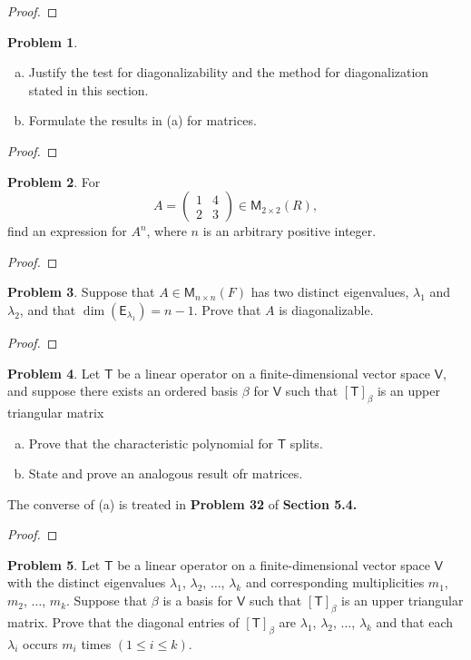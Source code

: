\documentclass[12pt]{book}
\theoremstyle{definition}
\newtheorem{problem}{Problem}
\begin{document}
	\begin{proof}
	\end{proof}
	\newpage
	\begin{problem}$\mathit{ }$
		\begin{enumerate}[(a)]
			\item Justify the test for diagonalizability and the method for diagonalization stated in this section.
			\item Formulate the results in (a) for matrices.
		\end{enumerate}
	\end{problem}
	\begin{proof}
	\end{proof}
	\newpage
	\begin{problem}
		For $$A=\begin{pmatrix}
			1&4\\2&3
		\end{pmatrix}\in\mathsf{M}_{2\times 2}(R),$$
		find an expression for $A^n$, where $n$ is an arbitrary positive integer.
	\end{problem}
	\begin{proof}
	\end{proof}
	\newpage
	\begin{problem}
		Suppose that $A\in\mathsf{M}_{n\times n}(F)$ has two distinct eigenvalues, $\lambda_1$ and $\lambda_2$, and that $\dim(\mathsf{E}_{\lambda_1})=n-1.$ Prove that $A$ is diagonalizable.
	\end{problem}
	\begin{proof}
	\end{proof}
	\newpage
	\begin{problem}
		Let $\mathsf{T}$ be a linear operator on a finite-dimensional vector space $\mathsf{V}$, and suppose there exists an ordered basis $\beta$ for $\mathsf{V}$ such that $[\mathsf{T}]_\beta$ is an upper triangular matrix
		\begin{enumerate}[(a)]
			\item Prove that the characteristic polynomial for $\mathsf{T}$ splits.
			\item State and prove an analogous result ofr matrices.
		\end{enumerate}
		The converse of (a) is treated in \textbf{Problem 32} of \textbf{Section 5.4.}
	\end{problem}
	\begin{proof}
	\end{proof}
	\newpage
	\begin{problem}
		Let $\mathsf{T}$ be a linear operator on a finite-dimensional vector space $\mathsf{V}$ with the distinct eigenvalues $\lambda_1$, $\lambda_2$, $\ldots$, $\lambda_k$ and corresponding multiplicities $m_1$, $m_2$, $\ldots$, $m_k$. Suppose that $\beta$ is a basis for $\mathsf{V}$ such that $[\mathsf{T}]_\beta$ is an upper triangular matrix. Prove that the diagonal entries of $[\mathsf{T}]_\beta$ are $\lambda_1$, $\lambda_2$, $\ldots$, $\lambda_k$ and that each $\lambda_i$ occurs $m_i$ times $(1\leq i \leq k).$
	\end{problem}
\end{document}
